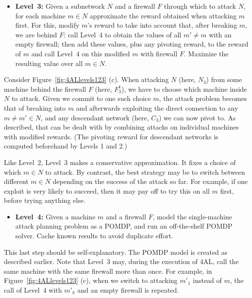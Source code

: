 \vspace{-0.05cm}
\begin{itemize}
\item \textbf{Level~3:} Given a subnetwork $N$ and a firewall $F$
  through which to attack $N$, for each machine $m \in N$ approximate
  the reward obtained when attacking $m$ first. For this, modify $m$'s
  reward to take into account that, after breaking $m$, we are behind
  $F$: call Level~4 to obtain the values of all $m' \neq m$ with an
  empty firewall; then add these values, plus any pivoting reward, to
  the reward of $m$ and call Level~4 on this modified $m$ with
  firewall $F$. Maximize the resulting value over all $m \in N$.
\end{itemize}
\vspace{-0.05cm}

Consider Figure~\ref{fig:4ALlevels123} (c). When attacking $N$ (here,
$N_3$) from some machine behind the firewall $F$ (here, $F^1_3$), we
have to choose which machine inside $N$ to attack. Given we commit to
one such choice $m$, the attack problem becomes that of breaking into
$m$ and afterwards exploiting the direct connection to any $m \neq m'
\in N$, and any descendant network (here, $C_3$) we can now pivot
to. As described, that can be dealt with by combining attacks on
individual machines with modified rewards. (The pivoting reward for
descendant networks is computed beforehand by Levels 1 and 2.)


Like Level~2, Level~3 makes a conservative approximation. It fixes a
choice of which $m \in N$ to attack. By contrast, the best strategy
may be to switch between different $m \in N$ depending on the success
of the attack so far. For example, if one exploit is very likely to
succeed, then it may pay off to try this on all $m$ first, before
trying anything else.


\vspace{-0.05cm}
\begin{itemize}
\item \textbf{Level~4:} Given a machine $m$ and a firewall $F$, model
  the single-machine attack planning problem as a POMDP, and run an
  off-the-shelf POMDP solver. Cache known results to avoid duplicate
  effort.
\end{itemize}
\vspace{-0.05cm}

This last step should be self-explanatory. The POMDP model is created
as described earlier. Note that Level~3 may, during the execution of
4AL, call the same machine with the same firewall more than once. For
example, in Figure~\ref{fig:4ALlevels123} (c), when we switch to
attacking $m'_1$ instead of $m$, the call of Level~4 with $m'_k$ and
an empty firewall is repeated.

